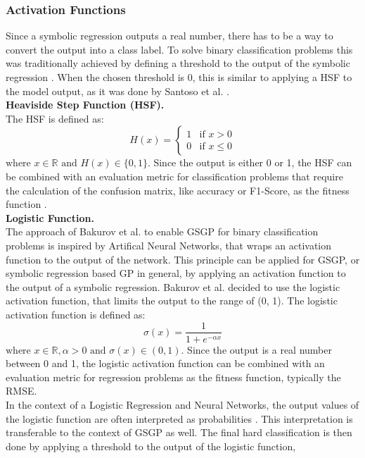 \documentclass[manuscript, review, anonymous]{acmart} %
\begin{document}
\subsubsection{Activation Functions}
Since a symbolic regression outputs a real number, there has
to be a way to convert the output into a
class label.
To solve binary classification problems this was traditionally achieved by
defining a threshold to the output of the symbolic regression
\cite{Espejo2010}.
When the chosen threshold is 0, this is similar to
applying a HSF to the model output, as it was
done by Santoso et al. \cite{Santoso2021}.\\
\textbf{Heaviside Step Function (HSF).}\\
The HSF is defined as:
\[
H(x) =
\begin{cases}
1 & \text{if } x > 0 \\
0 & \text{if } x \leq 0
\end{cases}
\]
$\text{where } x \in \mathbb{R} \text{ and } H(x) \in
\{0, 1\}$.
Since the output is either 0 or 1, the HSF
can be combined with an evaluation metric for classification problems
that require the calculation of the confusion matrix,
like accuracy or F1-Score, as the fitness function \cite{Santoso2021}.\\
\textbf{Logistic Function.}\\
The approach of Bakurov et al. \cite{Bakurov2019} to enable GSGP for binary classification
problems is inspired by Artifical Neural Networks,
that wraps an activation function to the output of the
network. This principle can be applied for GSGP,
or symbolic regression based GP in general, by applying an
activation function to the output of a symbolic regression.
Bakurov et al. \cite{Bakurov2019} decided to use the logistic activation function, that limits
the output to the range of (0, 1).
The logistic activation function is defined as:
\[
\sigma(x) = \frac{1}{1 + e^{-\alpha x}}
\]
$\text{where } x \in \mathbb{R}, \alpha > 0 \text{ and } \sigma(x) \in
(0, 1)$.
Since the output is a real number between 0 and
1,
the logistic activation function can be combined with an evaluation
metric for regression problems as the fitness function,
typically the RMSE.\\
In the context of a Logistic Regression and Neural Networks, 
the output values of the logistic function are often interpreted
as probabilities \cite{Muller2014}. This interpretation is transferable
to the context of GSGP as well. The final hard
classification is then done by applying a threshold to the
output of the logistic function,
\end{document}
